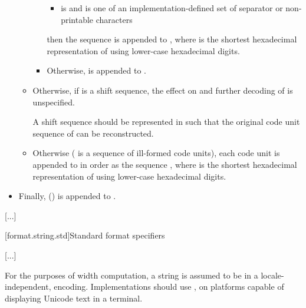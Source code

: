\documentclass{wg21}
\begin{document}
\begin{itemize}
\begin{itemize}
\begin{itemize}
\begin{itemize}
                \item
                 is  and
                 is one of an implementation-defined set
                of separator or non-printable characters
            \end{itemize}


            then the sequence 
            is appended to ,
            where 
            is the shortest hexadecimal representation
            of  using lower-case hexadecimal digits.

            \item
            Otherwise,  is appended to .
        \end{itemize}

        \item
        Otherwise, if  is a shift sequence,
        the effect on  and further decoding of 
        is unspecified.

        \recommended
        A shift sequence should be represented in 
        such that the original code unit sequence of 
        can be reconstructed.

        \item
        Otherwise ( is a sequence of ill-formed code units),
        each code unit  is appended to  in order
        as the sequence ,
        where 
        is the shortest hexadecimal representation of 
        using lower-case hexadecimal digits.
    \end{itemize}

    \item
    Finally,  ()
    is appended to .
\end{itemize}

\textcolor{noteclr}{[...]}

[format.string.std]{Standard format specifiers}

\textcolor{noteclr}{[...]}

\pnum
For the purposes of width computation,
a string is assumed to be in
a locale-independent,
 encoding.
Implementations should use ,
on platforms capable of displaying Unicode text in a terminal.
\end{document}
